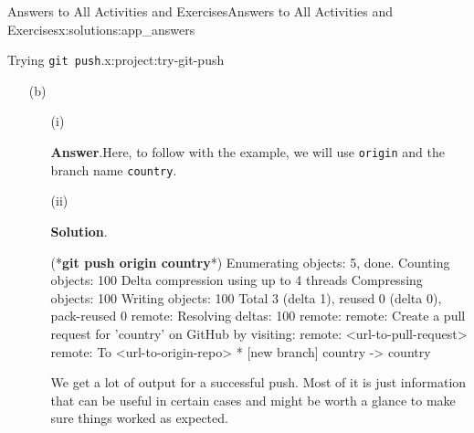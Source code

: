\documentclass[oneside,10pt,]{book}
\newcommand{\blocktitlefont}{\relax}
\newcommand{\mono}[1]{\texttt{#1}}
\newcommand{\consoleinput}[1]{\textbf{#1}}
\begin{document}
\begin{solutions-chapter}{Answers to All Activities and Exercises}{}{Answers to All Activities and Exercises}{}{}{x:solutions:app_answers}
\begin{projectsolution}{4.7}{Trying \mono{git push}.}{x:project:try-git-push}
\begin{enumerate}[font=\bfseries,label=(\alph*),ref=\alph*]
\begin{enumerate}[font=\bfseries,label=(\roman*),ref=\theenumi.\roman*]
\begin{console}{0}{1}{0}
    git push --set-upstream origin country
\end{console}
Well, look at that, the same error. This should make sense. You are telling Git to push changes to the origin repo but \mono{country}, the current branch, doesn't have an origin since we created the branch locally.%
\item[(iii)]\par\smallskip%
\noindent\textbf{\blocktitlefont Solution}.\hypertarget{g:solution:idm479761112-back}{}\quad{}\begin{console}{0}{1}{0}
(*\consoleinput{git push country}*)
fatal: 'country' does not appear to be a git repository
fatal: Could not read from remote repository.

Please make sure you have the correct access rights
and the repository exists.
\end{console}
Remember the four parts to \mono{git push}? Well since we forgot Step 3, the remote name, Git assumes that the word ``country'' is the name of the repo we want to push to. Since there is no repo named ``country'' on your computer nor on GitHub, it doens't know where to push and errors out.%
\end{enumerate}
\item[(b)]\begin{enumerate}[font=\bfseries,label=(\roman*),ref=\theenumi.\roman*]
\item[(i)]\par\smallskip%
\noindent\textbf{\blocktitlefont Answer}.\hypertarget{g:answer:idm479762520-back}{}\quad{}Here, to follow with the example, we will use \mono{origin} and the branch name \mono{country}.%
\item[(ii)]\par\smallskip%
\noindent\textbf{\blocktitlefont Solution}.\hypertarget{g:solution:idm479759960-back}{}\quad{}\begin{console}{0}{1}{0}
(*\consoleinput{git push origin country}*)
Enumerating objects: 5, done.
Counting objects: 100%
Delta compression using up to 4 threads
Compressing objects: 100%
Writing objects: 100%
Total 3 (delta 1), reused 0 (delta 0), pack-reused 0
remote: Resolving deltas: 100%
remote: 
remote: Create a pull request for 'country' on GitHub by visiting:
remote:      <url-to-pull-request>
remote: 
To <url-to-origin-repo>
 * [new branch]      country -> country
\end{console}
We get a lot of output for a successful push. Most of it is just information that can be useful in certain cases and might be worth a glance to make sure things worked as expected.%

\end{enumerate}
\end{enumerate}
\end{projectsolution}
\end{solutions-chapter}
\end{document}
